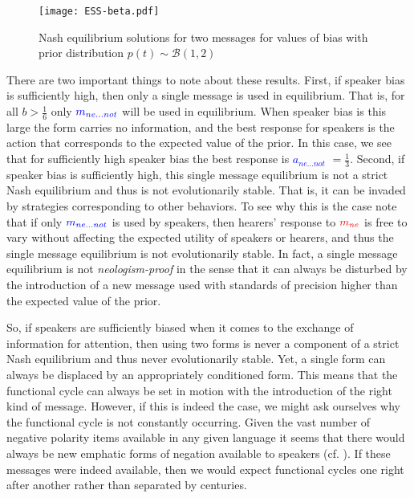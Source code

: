 \documentclass[linguex]{sp}
\theoremstyle{definition} \newtheorem{definition}{Definition}
\begin{document}
\begin{figure}
\begin{center}
	\texttt{[image: ESS-beta.pdf]}
	\caption{Nash equilibrium solutions for two messages for values of bias with prior distribution $p(t) \sim \mathcal{B}(1,2)$}
	\label{ESS-beta}
\end{center}
\end{figure}

There are two important things to note about these results. First, if speaker bias is sufficiently high, then only a single message is used in equilibrium. That is, for all $b > \frac{1}{6}$ only $\textcolor{blue}{m_{ne...not}}$ will be used in equilibrium.  When speaker bias is this large the form carries no information, and the best response for speakers is the action that corresponds to the expected value of the prior. In this case, we see that for sufficiently high speaker bias the best response is \emph{\textcolor{blue}{$a_{ne...not}$}} $ = \frac{1}{3}$. Second, if speaker bias is sufficiently high, this single message equilibrium is not a strict Nash equilibrium and thus is not evolutionarily stable. That is, it can be invaded by strategies corresponding to other behaviors. To see why this is the case note that if only $\textcolor{blue}{m_{ne...not}}$ is used by speakers, then hearers' response to $\textcolor{red}{m_{ne}}$ is free to vary without affecting the expected utility of speakers or hearers, and thus the single message equilibrium is not evolutionarily stable. In fact, a single message   equilibrium is not \emph{neologism-proof} \citep{farrell:1993} in the sense that it can always be disturbed by the introduction of a new message used with standards of precision higher than the expected value of the prior.

So, if speakers are sufficiently biased when it comes to the exchange of information for attention, then using two forms is never a component of a strict Nash equilibrium and thus never evolutionarily stable. Yet, a single form can always be displaced by an appropriately conditioned form. This means that the functional cycle can always be set in motion with the introduction of the right kind of message. However, if this is indeed the case, we might ask ourselves why the functional cycle is not constantly occurring. Given the vast number of negative polarity items available in any given language it seems that there would always be new emphatic forms of negation available to speakers (cf. \citealt{horn:1989}). If these messages were indeed available, then we would expect functional cycles one right after another rather than separated by centuries.
\end{document}
